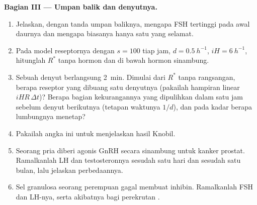 \begin{problem}
\medskip
\noindent\textbf{Bagian III --- Umpan balik dan denyutnya.}
\begin{enumerate}[resume]
  \item Jelaskan, dengan tanda umpan baliknya, mengapa FSH tertinggi
        pada awal daurnya dan mengapa biasanya hanya satu  yang
        selamat.
  \item Pada model reseptornya dengan $s = 100$ tiap jam, $d =
        \qty{0.5}{h^{-1}}$, $iH = \qty{6}{h^{-1}}$, hitunglah $R^*$
        tanpa hormon dan di bawah hormon sinambung.
  \item Sebuah denyut berlangsung \qty{2}{min}. Dimulai dari $R^*$
        tanpa rangsangan, berapa reseptor yang dibuang satu denyutnya
        (pakailah hampiran linear $iHR\,\Delta t$)? Berapa bagian
        kekurangannya yang dipulihkan dalam satu jam sebelum denyut
        berikutnya (tetapan waktunya $1/d$), dan pada kadar berapa
        lumbungnya menetap?
  \item Pakailah angka ini untuk menjelaskan hasil Knobil.
  \item Seorang pria diberi agonis GnRH secara sinambung untuk kanker
        prostat. Ramalkanlah LH dan testosteronnya sesudah satu hari
        dan sesudah satu bulan, lalu jelaskan perbedaannya.
  \item Sel granulosa seorang perempuan gagal membuat inhibin.
        Ramalkanlah FSH dan LH-nya, serta akibatnya bagi perekrutan
        .
\end{enumerate}


\end{problem}

